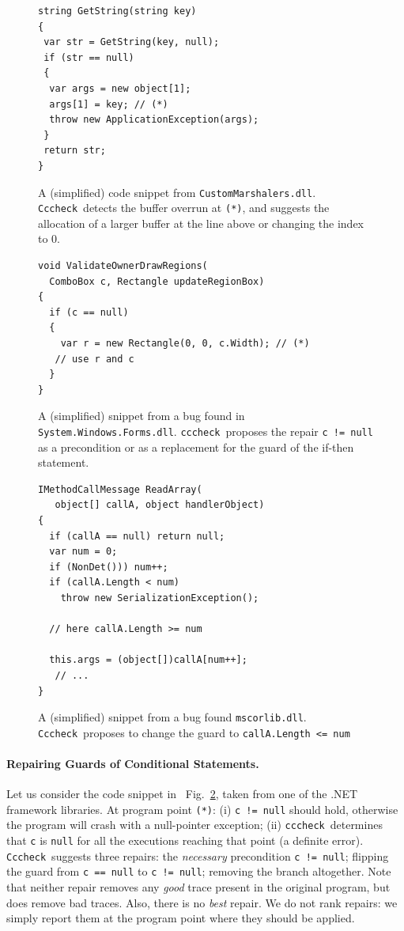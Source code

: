 \documentclass[10pt]{sigplanconf}
\newcommand{\labelFig}[1]{\label{fig:#1}}
\newcommand{\refFig}[1]{Fig.~\ref{fig:#1}}
\newcommand{\code}[1]{\texttt{#1}}
\newcommand{\clousot}{\code{cccheck}}
\newcommand{\Clousot}{\code{Cccheck}}
\begin{document}
\begin{figure}
\begin{lstlisting}
string GetString(string key)    
{
 var str = GetString(key, null);
 if (str == null)
 {
  var args = new object[1];
  args[1] = key; // (*)
  throw new ApplicationException(args);
 }
 return str;
}
\end{lstlisting}
\caption{A (simplified) code snippet from  \code{CustomMarshalers.dll}.
\Clousot\ detects the buffer overrun at \code{(*)}, and suggests the allocation of a larger buffer at the line above or changing the index to $0$.}
\labelFig{ArrayInitExample}
\end{figure}

\begin{figure}[t]
\begin{lstlisting}
void ValidateOwnerDrawRegions(
  ComboBox c, Rectangle updateRegionBox)
{
  if (c == null)
  {
    var r = new Rectangle(0, 0, c.Width); // (*)
   // use r and c
  }
}
\end{lstlisting}
\caption{A (simplified) snippet from a bug found in \code{System.Windows.Forms.dll}. 
\clousot\ proposes the repair \code{c != null} as a precondition or as a replacement
for the guard of the if-then statement.}
\labelFig{NNExample}
\end{figure}

\begin{figure}[t]
\begin{lstlisting}
IMethodCallMessage ReadArray(
   object[] callA, object handlerObject)
{
  if (callA == null) return null;
  var num = 0;
  if (NonDet())) num++; 
  if (callA.Length < num) 
    throw new SerializationException();

  // here callA.Length >= num
 
  this.args = (object[])callA[num++];
   // ...
}
\end{lstlisting}
\caption{A (simplified) snippet from a bug found \code{mscorlib.dll}. 
\Clousot\ proposes to change the guard to \code{callA.Length <= num}}
\labelFig{Strengthening}
\end{figure}

\paragraph{Repairing Guards of Conditional Statements.} 
Let us consider the code snippet in ~\refFig{NNExample}, taken from one of the .NET framework libraries.
At program point \code{(*)}: (i) \code{c != null} should hold, otherwise the program will crash with a null-pointer exception;
(ii) \clousot\ determines that  \code{c} is \code{null} for all the executions reaching that point (a definite error).
\Clousot\ suggests three repairs: the \emph{necessary} precondition \code{c != null};
flipping the guard from \code{c == null} to \code{c != null}; removing the branch altogether.
 Note that neither repair removes any \emph{good} trace present in the original program, but does remove bad traces.
Also, there is no \emph{best} repair. 
We do not rank repairs: we simply report them at the program point where they should be applied.
\end{document}
